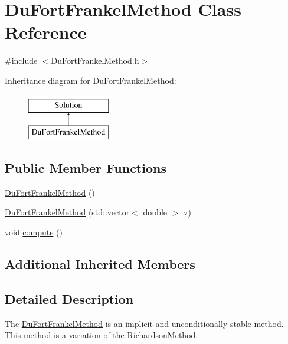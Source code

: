 \hypertarget{class_du_fort_frankel_method}{}\section{Du\+Fort\+Frankel\+Method Class Reference}
\label{class_du_fort_frankel_method}


{\ttfamily \#include $<$Du\+Fort\+Frankel\+Method.\+h$>$}

Inheritance diagram for Du\+Fort\+Frankel\+Method\+:\begin{figure}[H]
\begin{center}
\leavevmode
\includegraphics[height=2.000000cm]{class_du_fort_frankel_method}
\end{center}
\end{figure}
\subsection*{Public Member Functions}
\begin{DoxyCompactItemize}
\item 
\hyperlink{class_du_fort_frankel_method_ae4f8e7c2d498265fa8b8e6ea0bd74288}{Du\+Fort\+Frankel\+Method} ()
\item 
\hyperlink{class_du_fort_frankel_method_a56355289a2ead5d2aa0092687804597b}{Du\+Fort\+Frankel\+Method} (std\+::vector$<$ double $>$ v)
\item 
void \hyperlink{class_du_fort_frankel_method_a68b9ad88883a71daba4c2fc92355b173}{compute} ()
\end{DoxyCompactItemize}
\subsection*{Additional Inherited Members}


\subsection{Detailed Description}
The \hyperlink{class_du_fort_frankel_method}{Du\+Fort\+Frankel\+Method} is an implicit and unconditionally stable method. ~\newline
 This method is a variation of the \hyperlink{class_richardson_method}{Richardson\+Method}. 

